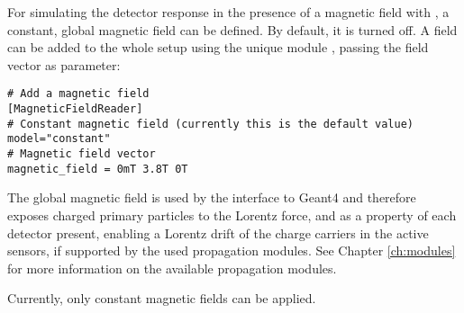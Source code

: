 For simulating the detector response in the presence of a magnetic field with \apsq, a constant, global magnetic field can be defined. By default, it is turned off. A field can be added to the whole setup using the unique module , passing the field vector as parameter:
\begin{verbatim}
# Add a magnetic field
[MagneticFieldReader]
# Constant magnetic field (currently this is the default value)
model="constant"
# Magnetic field vector
magnetic_field = 0mT 3.8T 0T
\end{verbatim}

The global magnetic field is used by the interface to Geant4 and therefore exposes charged primary particles to the Lorentz force, and as a property of each detector present, enabling a Lorentz drift of the charge carriers in the active sensors, if supported by the used propagation modules. See Chapter \ref{ch:modules} for more information on the available propagation modules.

Currently, only constant magnetic fields can be applied.

